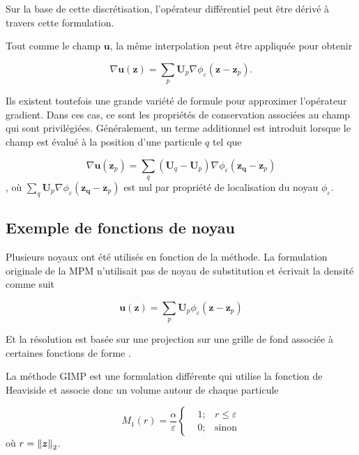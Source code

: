 Sur la base de cette discrétisation, l'opérateur différentiel peut être dérivé à travers cette formulation.

Tout comme le champ $\bm u$, la même interpolation peut être appliquée pour obtenir

\begin{equation*}
    \nabla \bm{u}(\bm{z}) = \sum_p \bm{U}_p \nabla \phi_\varepsilon (\bm{z}-\bm{z}_p).
\end{equation*}

Ils existent toutefois une grande variété de formule pour approximer l'opérateur gradient. Dans ces cas, ce sont les propriétés de conservation associées au champ qui sont privilégiées.
Généralement, un terme additionnel est introduit lorsque le champ est évalué à la position d'une particule $q$ tel que

\begin{equation*}
    \nabla \bm{u}(\bm{z}_p) = \sum_q (\bm{U}_q - \bm{U}_p) \nabla \phi_\varepsilon (\bm{z_q}-\bm{z}_p)
\end{equation*}, où $\sum_q \bm{U}_p \nabla \phi_\varepsilon (\bm{z_q}-\bm{z}_p)$ est nul par propriété de localisation du noyau $\phi_\varepsilon$.


\subsection{Exemple de fonctions de noyau}

Plusieurs noyaux ont été utilisés en fonction de la méthode. La formulation originale de la MPM n'utilisait pas de noyau de substitution et écrivait la densité comme suit

\begin{equation*}
    \bm{u}(\bm{z}) = \sum_p \bm{U}_p \phi_\varepsilon (\bm{z}-\bm{z}_p)
\end{equation*}

Et la résolution est basée sur une projection sur une grille de fond associée à certaines fonctions de forme \cite{sulsky_particle_1994}.

La méthode GIMP est une formulation différente qui utilise la fonction de Heaviside \cite{bardenhagen_generalized_2004} et associe donc un volume autour de chaque particule

\begin{equation*}
    M_1(r) = \frac{\alpha}{\varepsilon}\left\{\begin{aligned}
         & 1; & r \leq \varepsilon \\
         & 0; & \text{sinon}
    \end{aligned}
    \right.
\end{equation*}où $r = \left\lVert \bm{z} \right\rVert_2$.

